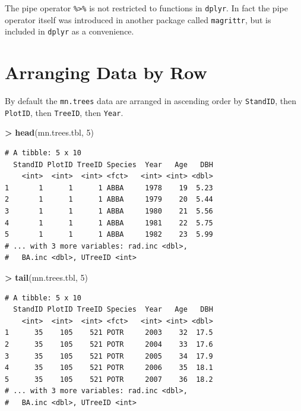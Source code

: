 \documentclass[]{krantz}
\makeatletter
\newenvironment{Shaded}{\begin{snugshade}}{\end{snugshade}}
\newcommand{\KeywordTok}[1]{\textcolor[rgb]{0.27,0.27,0.27}{\textbf{#1}}}
\newcommand{\DecValTok}[1]{\textcolor[rgb]{0.06,0.06,0.06}{#1}}
\newcommand{\StringTok}[1]{\textcolor[rgb]{0.5,0.5,0.5}{#1}}
\newcommand{\OperatorTok}[1]{\textcolor[rgb]{0.43,0.43,0.43}{\textbf{#1}}}
\newcommand{\NormalTok}[1]{#1}
\newenvironment{kframe}{%
\medskip{}
\setlength{\fboxsep}{.8em}
 \def\at@end@of@kframe{}%
 \ifinner\ifhmode%
  \def\at@end@of@kframe{\end{minipage}}%
  \begin{minipage}{\columnwidth}%
 \fi\fi%
 \def\FrameCommand##1{\hskip\@totalleftmargin \hskip-\fboxsep
 \colorbox{shadecolor}{##1}\hskip-\fboxsep
     \hskip-\linewidth \hskip-\@totalleftmargin \hskip\columnwidth}%
 \MakeFramed {\advance\hsize-\width
   \@totalleftmargin\z@ \linewidth\hsize
   \@setminipage}}%
 {\par\unskip\endMakeFramed%
 \at@end@of@kframe}
\renewenvironment{Shaded}{\begin{kframe}}{\end{kframe}}
\theoremstyle{definition}
\theoremstyle{definition}
\theoremstyle{definition}
\theoremstyle{remark}
\makeatother
\begin{document}
The pipe operator \texttt{\%\textgreater{}\%} is not restricted to
functions in \texttt{dplyr}. In fact the pipe operator itself was
introduced in another package called \texttt{magrittr}, but is included
in \texttt{dplyr} as a convenience.

\section{Arranging Data by Row}\label{arranging-data-by-row}

By default the \texttt{mn.trees} data are arranged in ascending order by
\texttt{StandID}, then \texttt{PlotID}, then \texttt{TreeID}, then
\texttt{Year}.

\begin{Shaded}
\begin{Highlighting}[]
\OperatorTok{>}\StringTok{ }\KeywordTok{head}\NormalTok{(mn.trees.tbl, }\DecValTok{5}\NormalTok{)}
\end{Highlighting}
\end{Shaded}

\begin{verbatim}
# A tibble: 5 x 10
  StandID PlotID TreeID Species  Year   Age   DBH
    <int>  <int>  <int> <fct>   <int> <int> <dbl>
1       1      1      1 ABBA     1978    19  5.23
2       1      1      1 ABBA     1979    20  5.44
3       1      1      1 ABBA     1980    21  5.56
4       1      1      1 ABBA     1981    22  5.75
5       1      1      1 ABBA     1982    23  5.99
# ... with 3 more variables: rad.inc <dbl>,
#   BA.inc <dbl>, UTreeID <int>
\end{verbatim}

\begin{Shaded}
\begin{Highlighting}[]
\OperatorTok{>}\StringTok{ }\KeywordTok{tail}\NormalTok{(mn.trees.tbl, }\DecValTok{5}\NormalTok{)}
\end{Highlighting}
\end{Shaded}

\begin{verbatim}
# A tibble: 5 x 10
  StandID PlotID TreeID Species  Year   Age   DBH
    <int>  <int>  <int> <fct>   <int> <int> <dbl>
1      35    105    521 POTR     2003    32  17.5
2      35    105    521 POTR     2004    33  17.6
3      35    105    521 POTR     2005    34  17.9
4      35    105    521 POTR     2006    35  18.1
5      35    105    521 POTR     2007    36  18.2
# ... with 3 more variables: rad.inc <dbl>,
#   BA.inc <dbl>, UTreeID <int>
\end{verbatim}
\end{document}
